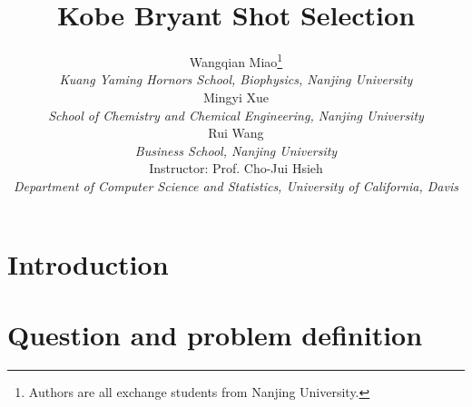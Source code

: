 \documentclass[a4paper,11pt,onecolumn,twoside]{article}
\title{\Large \textbf{Kobe Bryant Shot Selection}}
\author{
Wangqian Miao\footnote{Authors are all exchange students from Nanjing University.}
\\[2pt]
{\large \textit{Kuang Yaming Hornors School, Biophysics, Nanjing University}}\\[6pt]
Mingyi Xue\\[2pt]
{\large \textit{School of Chemistry and Chemical Engineering, Nanjing University}}\\[6pt]
Rui Wang\\[2pt]
{\large \textit{Business School, Nanjing University}}\\[6pt]
Instructor: Prof. Cho-Jui Hsieh\\[2pt]
{\large \textit{Department of Computer Science and Statistics, University of California, Davis}}\\[2pt]
}
\date{}
\begin{document}
\maketitle
\thispagestyle{firststyle}
\setlength{\oddsidemargin}{ 1cm}
\setlength{\evensidemargin}{\oddsidemargin}
\setlength{\textwidth}{15.50cm}
\vspace{-.8cm}
\setcounter{page}{1}
\setlength{\oddsidemargin}{-.5cm}  %
\setlength{\evensidemargin}{\oddsidemargin}
\setlength{\textwidth}{17.00cm}
\tableofcontents
\newpage
\section{Introduction}

\section{Question and problem definition}
\end{document}
